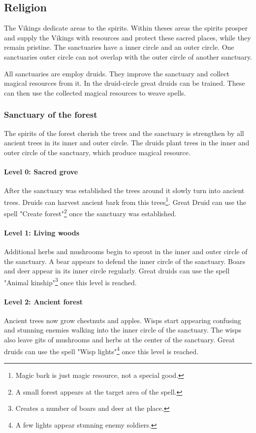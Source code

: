 \documentclass[a4paper]{article}
\begin{document}
	\subsection{Religion}
		The \gls{Vikings} dedicate areas to the spirits.
		Within theses areas the spirits prosper and supply the \gls{Vikings}
		with resources and protect these sacred places,
		while they remain pristine.
		The sanctuaries have a inner circle and an outer circle.
		One sanctuaries outer circle can not overlap with the outer circle of another sanctuary.

		All sanctuaries are employ druids.
		They improve the sanctuary and collect magical resources from it.
		In the druid-circle great druids can be trained.
		These can then use the collected magical resources to weave spells.

		\subsubsection{Sanctuary of the forest}
			The spirits of the forest cherish the trees and the sanctuary is strengthen by
			all ancient trees in its inner and outer circle.
			The druids plant trees in the inner and outer circle of the sanctuary,
			which produce magical resource.

			\paragraph{Level 0: Sacred grove}
				After the sanctuary was established the trees around it slowly turn into ancient trees.
				Druids can harvest ancient bark from this trees\footnote{
					Magic bark is just magic resource, not a special good.
				}.
				Great Druid can use the spell "Create forest"\footnote{
					A small forest appears at the target area of the spell.
				} once the sanctuary was established.

			\paragraph{Level 1: Living woods}
				Additional herbs and mushrooms begin to sprout in the inner and outer circle
				of the sanctuary.
				A bear appears to defend the inner circle of the sanctuary.
				Boars and deer appear in its inner circle regularly.
				Great druids can use the spell "Animal kinship"\footnote{
					Creates a number of boars and deer at the place.
				} once this level is reached.

			\paragraph{Level 2: Ancient forest}
				Ancient trees now grow chestnuts and apples.
				Wisps start appearing confusing and stunning enemies walking into the inner circle
				of the sanctuary.
				The wisps also leave gits of mushrooms and herbs at the center of the sanctuary.
				Great druids can use the spell "Wisp lights"\footnote{
					A few lights appear stunning enemy soldiers.
				} once this level is reached.
\end{document}
